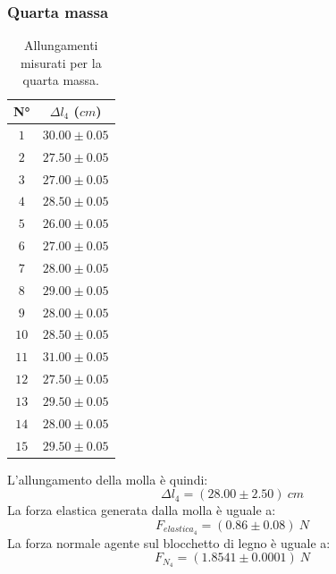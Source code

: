\documentclass[11pt]{article}
\begin{document}
\subsubsection{Quarta massa}
\begin{table}[H]
\centering
\begin{tabular}{|c|c|}
\hline
\textbf{N°} & \textbf{$\Delta l_4$ ($cm$)}\\
\hline
$1$ & $30.00\pm 0.05$ \\
\hline
$2$ & $27.50\pm 0.05$ \\
\hline
$3$ & $27.00\pm 0.05$ \\
\hline
$4$ & $28.50\pm 0.05$ \\
\hline
$5$ & $26.00\pm 0.05$ \\
\hline
$6$ & $27.00\pm 0.05$ \\
\hline
$7$ & $28.00\pm 0.05$ \\
\hline
$8$ & $29.00\pm 0.05$ \\
\hline
$9$ & $28.00\pm 0.05$ \\
\hline
$10$ & $28.50\pm 0.05$ \\
\hline
$11$ & $31.00\pm 0.05$ \\
\hline
$12$ & $27.50\pm 0.05$ \\
\hline
$13$ & $29.50\pm 0.05$ \\
\hline
$14$ & $28.00\pm 0.05$ \\
\hline
$15$ & $29.50\pm 0.05$ \\
\hline
\end{tabular}
\caption{Allungamenti misurati per la quarta massa.}
\label{tab:}
\end{table}
L'allungamento della molla è quindi:
\begin{equation}
    \Delta l_4=(28.00\pm 2.50)\ cm
\end{equation}
La forza elastica generata dalla molla è uguale a:
\begin{equation}
    F_{elastica_4} = (0.86\pm 0.08)\ N
\end{equation}
La forza normale agente sul blocchetto di legno è uguale a:
\begin{equation}
    F_{N_4} = (1.8541\pm 0.0001)\ N
\end{equation}
\end{document}
